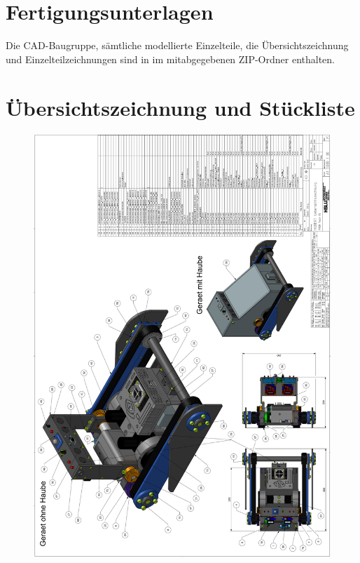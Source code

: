 \section{Fertigungsunterlagen}

Die CAD-Baugruppe, sämtliche modellierte Einzelteile, die Übersichtszeichnung und Einzelteilzeichnungen sind in im mitabgegebenen ZIP-Ordner enthalten.

\section{Übersichtszeichnung und Stückliste}

\newpage

\begin{figure}[H]
  \includegraphics[width=1\textwidth]{img/Gerät Aufbau/Übersichtszeichnung.PNG}
  \centering
\end{figure}

